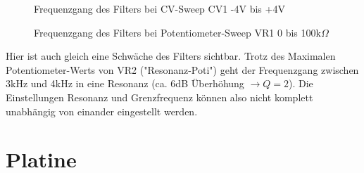 \begin{figure}[h]
	\centering
	\setlength{\fboxsep}{1pt} %
	\setlength{\fboxrule}{1pt} %
	\caption{Frequenzgang des Filters bei CV-Sweep CV1 -4V bis +4V}
	\label{fig:toleranzschema}
\end{figure}

\begin{figure}[h]
	\centering
	\setlength{\fboxsep}{1pt} %
	\setlength{\fboxrule}{1pt} %
	\caption{Frequenzgang des Filters bei Potentiometer-Sweep VR1 0 bis 100k$\Omega$}
	\label{fig:toleranzschema}
\end{figure}

Hier ist auch gleich eine Schwäche des Filters sichtbar. Trotz des Maximalen Potentiometer-Werts von VR2 ("Resonanz-Poti") geht der Frequenzgang
zwischen 3kHz und 4kHz in eine Resonanz (ca. 6dB Überhöhung $\rightarrow Q = 2$). Die Einstellungen Resonanz und Grenzfrequenz können also nicht komplett unabhängig von einander eingestellt werden.

\section{Platine}


